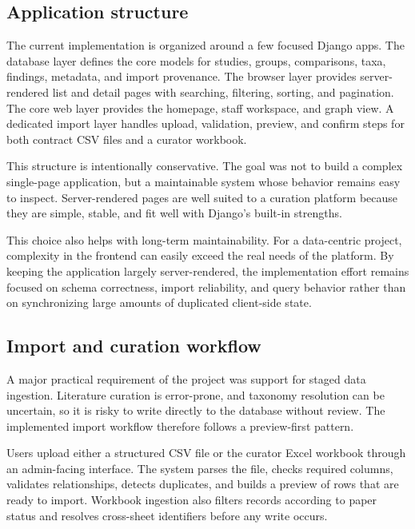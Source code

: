\subsection{Application structure}

The current implementation is organized around a few focused Django apps. The database layer defines the core models for studies, groups, comparisons, taxa, findings, metadata, and import provenance. The browser layer provides server-rendered list and detail pages with searching, filtering, sorting, and pagination. The core web layer provides the homepage, staff workspace, and graph view. A dedicated import layer handles upload, validation, preview, and confirm steps for both contract CSV files and a curator workbook.

This structure is intentionally conservative. The goal was not to build a complex single-page application, but a maintainable system whose behavior remains easy to inspect. Server-rendered pages are well suited to a curation platform because they are simple, stable, and fit well with Django's built-in strengths.

This choice also helps with long-term maintainability. For a data-centric project, complexity in the frontend can easily exceed the real needs of the platform. By keeping the application largely server-rendered, the implementation effort remains focused on schema correctness, import reliability, and query behavior rather than on synchronizing large amounts of duplicated client-side state.

\subsection{Import and curation workflow}

A major practical requirement of the project was support for staged data ingestion. Literature curation is error-prone, and taxonomy resolution can be uncertain, so it is risky to write directly to the database without review. The implemented import workflow therefore follows a preview-first pattern.

Users upload either a structured CSV file or the curator Excel workbook through an admin-facing interface. The system parses the file, checks required columns, validates relationships, detects duplicates, and builds a preview of rows that are ready to import. Workbook ingestion also filters records according to paper status and resolves cross-sheet identifiers before any write occurs.

